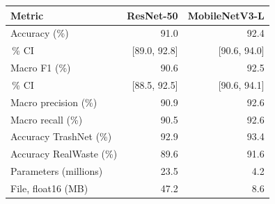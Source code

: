 \begin{tabular}{lrr}
\toprule
Metric & ResNet-50 & MobileNetV3-L \\
\midrule
Accuracy (\%) & 91.0 & 92.4 \\
\quad 95\,\% CI & [89.0, 92.8] & [90.6, 94.0] \\
Macro F1 (\%) & 90.6 & 92.5 \\
\quad 95\,\% CI & [88.5, 92.5] & [90.6, 94.1] \\
Macro precision (\%) & 90.9 & 92.6 \\
Macro recall (\%) & 90.5 & 92.6 \\
Accuracy TrashNet (\%) & 92.9 & 93.4 \\
Accuracy RealWaste (\%) & 89.6 & 91.6 \\
Parameters (millions) & 23.5 & 4.2 \\
File, float16 (MB) & 47.2 & 8.6 \\
\bottomrule
\end{tabular}

